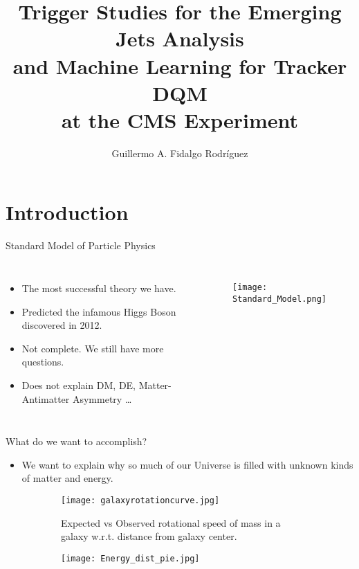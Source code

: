 \documentclass[8pt,aspectratio=169]{beamer}
\title[EMJ and ML4TkDQM]{Trigger Studies for the Emerging Jets Analysis \\and Machine Learning for Tracker DQM \\at the CMS Experiment}
\author[GAFR]{Guillermo A. Fidalgo Rodríguez}
\institute[UPRM]{University of Puerto Rico - Mayagüez}
\begin{document}
\maketitle

\begin{frame}
	\Large
	\tableofcontents
\end{frame}

\section{Introduction}

\begin{frame}{Standard Model of Particle Physics}
\begin{columns}

        \begin{itemize}
            \item The most successful theory we have.
            \item Predicted the infamous Higgs Boson discovered in 2012.
            \item Not complete. We still have more questions. 
            \item Does not explain DM, DE, Matter-Antimatter Asymmetry \dots
        \end{itemize}
        \begin{figure}
            \texttt{[image: Standard\_Model.png]}
        \end{figure}
\end{columns}
\end{frame}

\begin{frame}{What do we want to accomplish?}
	\begin{itemize}
		\item We want to explain why so much of our Universe is filled with unknown kinds of matter and energy.
	\end{itemize}
	\begin{figure}
		\centering
        \begin{subfigure}[t]{0.45\linewidth}
            \texttt{[image: galaxyrotationcurve.jpg]}
            \caption{Expected vs Observed rotational speed of mass in a galaxy w.r.t. distance from galaxy center.}
        \end{subfigure}
        \begin{subfigure}{0.45\linewidth}
            \texttt{[image: Energy\_dist\_pie.jpg]}
        \end{subfigure}
    \end{figure}
\end{frame}
\end{document}
